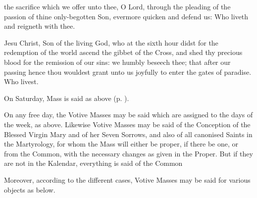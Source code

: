 
\vspace{-0.4\baselineskip}

\secret

\vspace{-0.2\baselineskip}

 the sacrifice which we offer unto thee, O Lord, through the pleading of the passion of thine only-begotten Son, evermore quicken and defend us: Who liveth and reigneth with thee.


\vspace{-0.5\baselineskip}

\postcommunion

\vspace{-0.25\baselineskip}

 Jesu Christ, Son of the living God, who at the sixth hour didst for the redemption of the world ascend the gibbet of the Cross, and shed thy precious blood for the remission of our sins: we humbly beseech thee; that after our passing hence thou wouldest grant unto us joyfully to enter the gates of paradise. Who livest.

\begin{rubric}
	On Saturday, Mass is said  as above (p. \pageref{MarySaturday}).
\end{rubric}

\begin{rubric}
On any free day, the Votive Masses may be said which are assigned to the days of the week, as above. Likewise Votive Masses may be said of the Conception of the Blessed Virgin Mary and of her Seven Sorrows, and also of all canonised Saints in the Martyrology, for whom the Mass will either be proper, if there be one, or from the Common, with the necessary changes as given in the Proper. But if they are not in the Kalendar, everything is said of the Common  

Moreover, according to the different cases, Votive Masses may be said for various objects as below.
\end{rubric}

